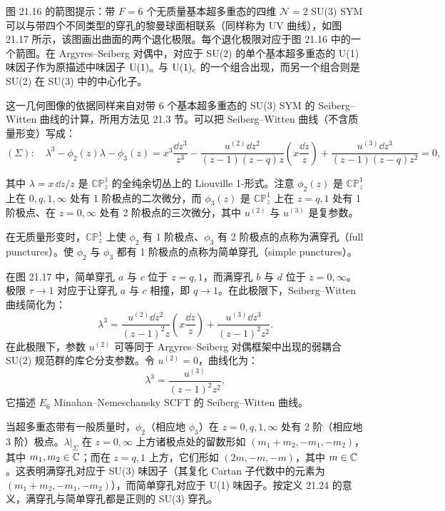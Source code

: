 
图 21.16 的箭图提示：带 $F=6$ 个无质量基本超多重态的四维 $\mathcal{N}=2$ SU(3) SYM 可以与带四个不同类型的穿孔的黎曼球面相联系（同样称为 UV 曲线），如图 21.17 所示，该图画出曲面的两个退化极限。每个退化极限对应于图 21.16 中的一个箭图。在 Argyres–Seiberg 对偶中，对应于 SU(2) 的单个基本超多重态的 U(1) 味因子作为原描述中味因子 $\operatorname{U}(1)_a$ 与 $\operatorname{U}(1)_c$ 的一个组合出现，而另一个组合则是 SU(2) 在 SU(3) 中的中心化子。

这一几何图像的依据同样来自对带 6 个基本超多重态的 SU(3) SYM 的 Seiberg–Witten 曲线的计算，所用方法见 21.3 节。可以把 Seiberg–Witten 曲线（不含质量形变）写成：
\[
(\Sigma):\quad
\lambda^3-\phi_2(z)\lambda-\phi_3(z)
=x^3\frac{\dd z^3}{z^3}
-\frac{u^{(2)}\dd z^2}{(z-1)(z-q)z}\left(x\frac{\dd z}{z}\right)
+\frac{u^{(3)}\dd z^3}{(z-1)(z-q)z^2}=0,
\]


其中 $\lambda=x\,\dd z/z$ 是 $\mathbb{CP}^1_z$ 的全纯余切丛上的 Liouville 1-形式。注意 $\phi_2(z)$ 是 $\mathbb{CP}^1_z$ 上在 $0,q,1,\infty$ 处有 1 阶极点的二次微分，而 $\phi_3(z)$ 是 $\mathbb{CP}^1_z$ 上在 $z=q,1$ 处有 1 阶极点、在 $z=0,\infty$ 处有 2 阶极点的三次微分，其中 $u^{(2)}$ 与 $u^{(3)}$ 是复参数。

\begin{definition}[21.32] 在无质量形变时，$\mathbb{CP}^1_z$ 上使 $\phi_2$ 有 1 阶极点、$\phi_3$ 有 2 阶极点的点称为满穿孔（full punctures）。使 $\phi_2$ 与 $\phi_3$ 都有 1 阶极点的点称为简单穿孔（simple punctures）。
\end{definition}

在图 21.17 中，简单穿孔 $a$ 与 $c$ 位于 $z=q,1$，而满穿孔 $b$ 与 $d$ 位于 $z=0,\infty$。极限 $\tau\to1$ 对应于让穿孔 $a$ 与 $c$ 相撞，即 $q\to1$。在此极限下，Seiberg–Witten 曲线简化为：
\[
\lambda^3=\frac{u^{(2)}\dd z^2}{(z-1)^2z}\left(x\frac{\dd z}{z}\right)+\frac{u^{(3)}\dd z^3}{(z-1)^2z^2}.
\]
在此极限下，参数 $u^{(2)}$ 可等同于 Argyres–Seiberg 对偶框架中出现的弱耦合 SU(2) 规范群的库仑分支参数。令 $u^{(2)}=0$，曲线化为：
\[
\lambda^3=\frac{u^{(3)}}{(z-1)^2z^2},
\]
它描述 $E_6$ Minahan–Nemeschansky SCFT 的 Seiberg–Witten 曲线。

\begin{remark}[21.33] 当超多重态带有一般质量时，$\phi_2$（相应地 $\phi_3$）在 $z=0,q,1,\infty$ 处有 2 阶（相应地 3 阶）极点。$\lambda|_\Sigma$ 在 $z=0,\infty$ 上方诸极点处的留数形如 $(m_1+m_2,-m_1,-m_2)$，其中 $m_1,m_2\in\mathbb{C}$；而在 $z=q,1$ 上方，它们形如 $(2m,-m,-m)$，其中 $m\in\mathbb{C}$。这表明满穿孔对应于 SU(3) 味因子（其复化 Cartan 子代数中的元素为 $(m_1+m_2,-m_1,-m_2)$），而简单穿孔对应于 U(1) 味因子。按定义 21.24 的意义，满穿孔与简单穿孔都是正则的 SU(3) 穿孔。
\end{remark}

